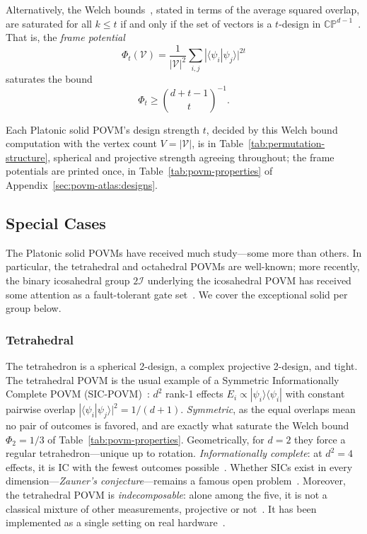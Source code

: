 \documentclass[11pt, oneside, openany]{scrbook}
\newcommand{\Igroup}{\mathcal{I}}  %
\newcommand{\TwoI}{2\Igroup}
\newcommand{\braket}[2]{\langle#1|#2\rangle}
\newcommand{\ketbra}[2]{|#1\rangle\langle#2|}
\begin{document}
Alternatively, the Welch bounds~\cite{welch1974lowerboundsmaximum}, stated in terms of the average squared overlap, are saturated for all $k \leq t$ if and only if the set of vectors is a $t$-design in $\mathbb{CP}^{d-1}$~\cite{klappenecker2005mutuallyunbiasedbases, datta2012geometrywelchbounds,belovs2008criterionattainingwelch}. That is, the \textit{frame potential}
$$ \Phi_t(\mathcal{V})=\frac{1}{|\mathcal{V}|^2}\sum_{i,j} |\braket{\psi_i}{\psi_j}|^{2t}$$ saturates the bound
$$\Phi_t\ge \binom{d+t-1}{t}^{-1}.$$

Each Platonic solid POVM's design strength $t$, decided by this Welch bound computation with the vertex count $V = |\mathcal{V}|$, is in Table~\ref{tab:permutation-structure}, spherical and projective strength agreeing throughout; the frame potentials are printed once, in Table~\ref{tab:povm-properties} of Appendix~\ref{sec:povm-atlas:designs}.

\subsection{Special Cases}

The Platonic solid POVMs have received much study---some more than others. In particular, the tetrahedral and octahedral POVMs are well-known; more recently, the binary icosahedral group $\TwoI$ underlying the icosahedral POVM has received some attention as a fault-tolerant gate set~\cite{parzanchevski2018supergoldengatespu2, kubischta2023familyquantumcodes,kubischta2024quantumcodestwisted,zhang2025transversalgatesnonadditive}. We cover the exceptional solid per group below.

\subsubsection{Tetrahedral} \label{subsubsec:tetrahedral-sic}

The tetrahedron is a spherical 2-design, a complex projective 2-design, and tight. The tetrahedral POVM is the usual example of a Symmetric Informationally Complete POVM (SIC-POVM)~\cite{renes2004symmetricinformationallycompletea}: $d^2$ rank-1 effects $E_i \propto \ketbra{\psi_i}{\psi_i}$ with constant pairwise overlap $|\braket{\psi_i}{\psi_j}|^2 = 1/(d+1)$. \textit{Symmetric}, as the equal overlaps mean no pair of outcomes is favored, and are exactly what saturate the Welch bound $\Phi_2 = 1/3$ of Table~\ref{tab:povm-properties}. Geometrically, for $d = 2$ they force a regular tetrahedron---unique up to rotation. \textit{Informationally complete}: at $d^2 = 4$ effects, it is IC with the fewest outcomes possible~\cite{geng2021whatareminimal}. Whether SICs exist in every dimension---\textit{Zauner's conjecture}---remains a famous open problem~\cite{zauner2011quantumdesignsfoundations}. Moreover, the tetrahedral POVM is \textit{indecomposable}: alone among the five, it is not a classical mixture of other measurements, projective or not~\cite{dariano2005classicalrandomnessquantum}. It has been implemented as a single setting on real hardware~\cite{stricker2022experimentalsinglesettingquantum}.
\end{document}
